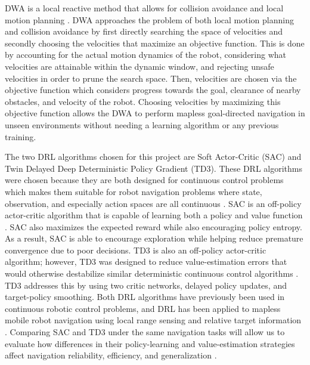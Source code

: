 \documentclass[conference, 11pt]{IEEEtran}
\begin{document}
DWA is a local reactive method that allows for collision avoidance and local motion planning \cite{Fox_Burgand}.
DWA approaches the problem of both local motion planning and collision avoidance by first directly searching the space of velocities and secondly choosing the velocities that maximize an objective function. 
This is done by accounting for the actual motion dynamics of the robot, considering what velocities are attainable within the dynamic window, and rejecting unsafe velocities in order to prune the search space.
Then, velocities are chosen via the objective function which considers progress towards the goal, clearance of nearby obstacles, and velocity of the robot. 
Choosing velocities by maximizing this objective function allows the DWA to perform mapless goal-directed navigation in unseen environments without needing a learning algorithm or any previous training.
\par
The two DRL algorithms chosen for this project are Soft Actor-Critic (SAC) and Twin Delayed Deep Deterministic Policy Gradient (TD3).
These DRL algorithms were chosen because they are both designed for continuous control problems which makes them suitable for robot navigation problems where state, observation, and especially action spaces are all continuous \cite{deJesus_SAC_Nav} \cite{Cimurs_TD3_Nav}.
SAC is an off-policy actor-critic algorithm that is capable of learning both a policy and value function \cite{Haarnoja_SAC}.
SAC also maximizes the expected reward while also encouraging policy entropy.
As a result, SAC is able to encourage exploration while helping reduce premature convergence due to poor decisions.
TD3 is also an off-policy actor-critic algorithm; however, TD3 was designed to reduce value-estimation errors that would otherwise destabilize similar deterministic continuous control algorithms \cite{Fujimoto_TD3}.
TD3 addresses this by using two critic networks, delayed policy updates, and target-policy smoothing.
Both DRL algorithms have previously been used in continuous robotic control problems, and DRL has been applied to mapless mobile robot navigation using local range sensing and relative target information \cite{Tai_Lei} \cite{8202312}.
Comparing SAC and TD3 under the same navigation tasks will allow us to evaluate how differences in their policy-learning and value-estimation strategies affect navigation reliability, efficiency, and generalization \cite{Dobrevski_Skočaj_2021} \cite{Tai_Lei}.
\end{document}
